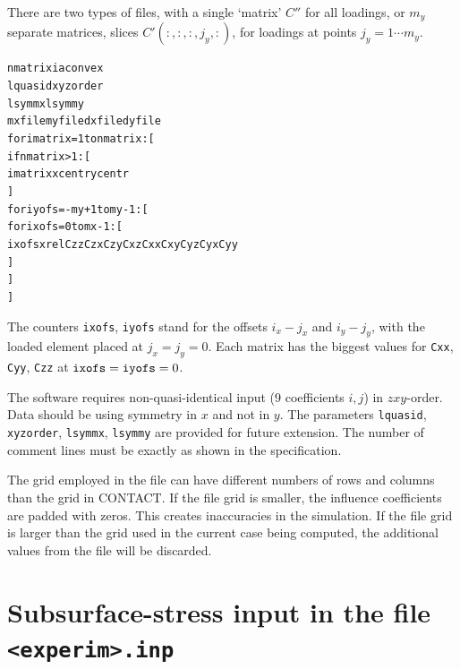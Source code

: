 \documentclass[12pt]{report}
\begin{document}
There are two types of files, with a single `matrix' $C''$ for all
loadings, or $m_y$ separate matrices, slices $C'(:,:,:,j_y,:)$, for
loadings at points $j_y=1\cdots m_y$.
\begin{alltt}
   nmatrix   iaconvex
   lquasid   xyzorder
   lsymmx    lsymmy
   mxfile    myfile   dxfile  dyfile
   for imatrix = 1 to nmatrix: [
      if nmatrix>1: [
         imatrix  xcentr  ycentr
      ]
      for iyofs = -my+1 to my-1: [
         for ixofs = 0 to mx-1: [
            ixofs   xrel   Czz  Czx  Czy   Cxz  Cxx  Cxy   Cyz  Cyx  Cyy 
         ]
      ]
   ]
\end{alltt}
The counters {\tt ixofs}, {\tt iyofs} stand for the offsets $i_x-j_x$ and
$i_y-j_y$, with the loaded element placed at $j_x=j_y=0$. Each matrix has
the biggest values for {\tt Cxx}, {\tt Cyy}, {\tt Czz} at ${\tt ixofs}=
{\tt iyofs}=0$.

The software requires non-quasi-identical input (9 coefficients $i,j$) in
$zxy$-order. Data should be using symmetry in $x$ and not in $y$. The
parameters {\tt lquasid}, {\tt xyzorder}, {\tt lsymmx}, {\tt lsymmy} are
provided for future extension.
The number of comment lines must be exactly as shown in the specification.

The grid employed in the file can have different numbers of rows and
columns than the grid in CONTACT. If the file grid is smaller, the
influence coefficients are padded with zeros. This creates inaccuracies in
the simulation. If the file grid is larger than the grid used in the
current case being computed, the additional values from the file will be
discarded.

\section{Subsurface-stress input in the file {\tt <experim>.inp}}
\label{sec:spec_subsinp}
\end{document}
